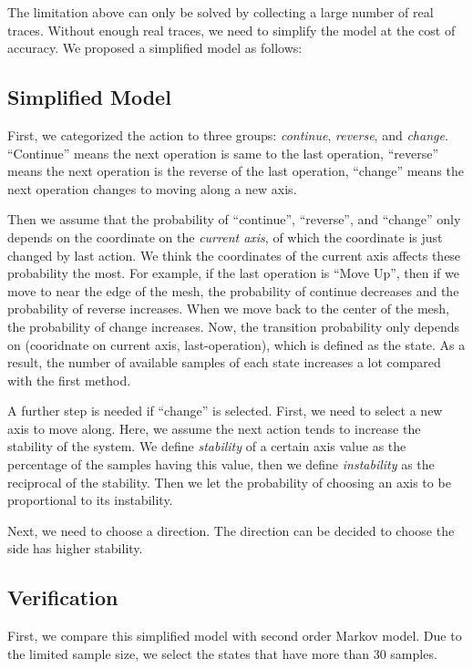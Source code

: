 The limitation above can only be solved by collecting a large number of real traces. Without enough real traces,
we need to simplify the model at the cost of accuracy. We proposed a simplified model as follows:

\subsection{Simplified Model}
First, we categorized the action to three groups: \textit{continue}, \textit{reverse}, and \textit{change}. 
``Continue'' means the next operation is same to the last operation, ``reverse'' means the next operation
is the reverse of the last operation, ``change'' means the next operation changes to moving along a new axis.

Then we assume that the probability of ``continue'', ``reverse'', and ``change'' only depends on the
coordinate on the \textit{current axis}, of which the coordinate is just changed by last action.
We think the coordinates of the current axis affects these probability the most. 
For example, if the last operation
is ``Move Up'', then if we move to near the edge of the mesh, the probability of continue decreases and the probability
of reverse increases. When we move back to the center of the mesh, the probability of change increases. 
Now, the transition probability only depends on (cooridnate on current axis, last-operation), which is defined as 
the state. As a result, the number of available samples of each state increases a lot compared
with the first method. 

A further step is needed if ``change'' is selected. First, we need to select a new axis to move along. Here, we 
assume the next action tends to increase the stability of the system. We define \textit{stability} of a certain 
axis value as the percentage of the samples having this value, then we define \textit{instability} as the reciprocal 
of the stability. Then we let the probability of choosing an axis to be proportional to its instability.  

Next, we need to choose a direction. The direction can be decided to choose the side has higher stability. 
\subsection{Verification}
First, we compare this simplified model with second order Markov model. Due to the limited sample size, we 
select the states that have more than 30 samples. 

